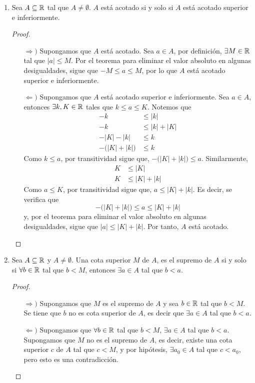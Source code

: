 \begin{enumerate}[label=\roman*)]
 \item Sea $A\subseteq \mathbb{R}$ tal que $A\neq \emptyset$. $A$ está acotado si y solo si $A$ está acotado superior e inferiormente.
 
 \begin{proof} \leavevmode
  \begin{itemize}
   \item[$\Rightarrow)$] Supongamos que $A$ está acotado. Sea $a\in A$, por definición, $\exists M\in \mathbb{R}$ tal que $|a|\leq M$. Por el teorema para eliminar el valor absoluto en algunas desigualdades, sigue que $-M\leq a \leq M$, por lo que $A$ está acotado superior e inferiormente.
   \item[$\Leftarrow)$] Supongamos que $A$ está acotado superior e inferiormente. Sea $a\in A$, entonces $\exists k, K\in \mathbb{R}$ tales que $k\leq a \leq K$. Notemos que
   \begin{align*}
    -k &\leq |k|\\
    -k &\leq |k| + |K|\\
    -|K|-|k| &\leq k\\
    - \big(|K|+|k|\big) &\leq k
   \end{align*}
   Como $k\leq a$, por transitividad sigue que, $-\big(|K|+|k|\big) \leq a$. Similarmente,
   \begin{align*}
    K &\leq |K|\\
    K &\leq |K| + |k|
   \end{align*}
   Como $a\leq K$, por transitividad sigue que, $a\leq |K|+|k|$. Es decir, se verifica que \[-\big(|K|+|k|\big) \leq a \leq |K|+|k|\]
   y, por el teorema para eliminar el valor absoluto en algunas desigualdades, sigue que $|a| \leq |K| + |k|$. Por tanto, $A$ está acotado. \qedhere
  \end{itemize}
 \end{proof}

 \item Sea $A\subseteq \mathbb{R}$ y $A\neq \emptyset$. Una cota superior $M$ de $A$, es el supremo de $A$ si y solo si $\forall b\in \mathbb{R}$ tal que $b<M$, entonces $\exists a\in A$ tal que $b<a$.
 \begin{proof}\leavevmode
 \begin{itemize}
 \item[$\Rightarrow)$] Supongamos que $M$ es el supremo de $A$ y sea $b\in \mathbb{R}$ tal que $b<M$. Se tiene que $b$ no es cota superior de $A$, es decir que $\exists a\in A$ tal que $b<a$.
 \item[$\Leftarrow)$] Supongamos que $\forall b\in \mathbb{R}$ tal que $b<M$, $\exists a\in A$ tal que $b<a$. Supongamos que $M$ no es el supremo de $A$, es decir, existe una cota superior $c$ de $A$ tal que $c<M$, y por hipótesis, $\exists a_0\in A$ tal que $c<a_0$, pero esto es una contradicción. \qedhere
 \end{itemize}
 \end{proof}


\end{enumerate}
